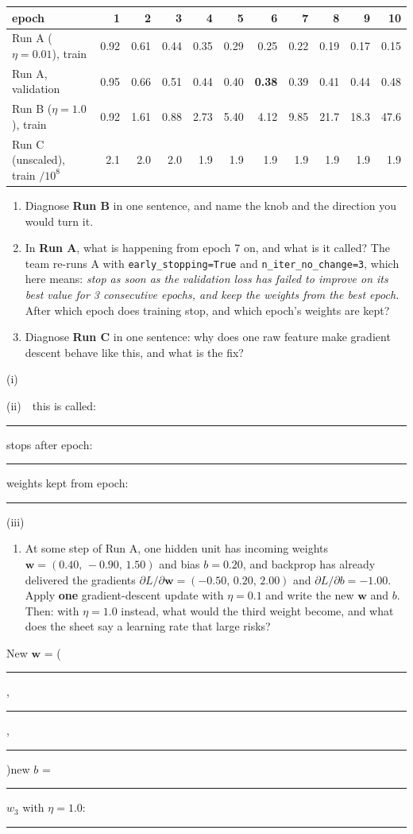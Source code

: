 \documentclass[
  11pt,
]{article}
\providecommand{\tightlist}{%
  \setlength{\itemsep}{0pt}\setlength{\parskip}{0pt}}
\newcommand{\answerspace}[1]{\par\vspace*{#1}}  %
\newcommand{\blank}[1][1.2in]{\rule{#1}{0.4pt}}
\begin{document}
\begin{center}\small\setlength{\tabcolsep}{4.5pt}
\begin{tabular}{@{}lrrrrrrrrrr@{}}\toprule
epoch & 1 & 2 & 3 & 4 & 5 & 6 & 7 & 8 & 9 & 10\\ \midrule
Run A ($\eta=0.01$), train      & 0.92 & 0.61 & 0.44 & 0.35 & 0.29 & 0.25 & 0.22 & 0.19 & 0.17 & 0.15\\
Run A, validation               & 0.95 & 0.66 & 0.51 & 0.44 & 0.40 & \textbf{0.38} & 0.39 & 0.41 & 0.44 & 0.48\\
Run B ($\eta=1.0$), train       & 0.92 & 1.61 & 0.88 & 2.73 & 5.40 & 4.12 & 9.85 & 21.7 & 18.3 & 47.6\\
Run C (unscaled), train $/10^8$ & 2.1 & 2.0 & 2.0 & 1.9 & 1.9 & 1.9 & 1.9 & 1.9 & 1.9 & 1.9\\
\bottomrule\end{tabular}\end{center}

\begin{enumerate}[label=(\roman*),leftmargin=3.2em,topsep=2pt]
\item Diagnose \textbf{Run B} in one sentence, and name the knob and the
  direction you would turn it.
\item In \textbf{Run A}, what is happening from epoch 7 on, and what is it
  called? The team re-runs A with \texttt{early\_stopping=True} and
  \texttt{n\_iter\_no\_change=3}, which here means: \emph{stop as soon as the
  validation loss has failed to improve on its best value for 3 consecutive
  epochs, and keep the weights from the best epoch.} After which epoch does
  training stop, and which epoch's weights are kept?
\item Diagnose \textbf{Run C} in one sentence: why does one raw feature make
  gradient descent behave like this, and what is the fix?
\end{enumerate}

\noindent (i)\answerspace{1in}
\noindent (ii)\ \ this is called: \blank[1.2in]\quad stops after epoch: \blank[0.5in]\quad weights kept from epoch: \blank[0.5in]\answerspace{1in}
\noindent (iii)\answerspace{1in}

\begin{enumerate}
\def\labelenumi{(\alph{enumi})}
\setcounter{enumi}{2}
\tightlist
\item
  At some step of Run A, one hidden unit has incoming weights
  \(\mathbf w = (0.40,\,-0.90,\,1.50)\) and bias \(b = 0.20\), and
  backprop has already delivered the gradients
  \(\partial L/\partial \mathbf w = (-0.50,\,0.20,\,2.00)\) and
  \(\partial L/\partial b = -1.00\). Apply \textbf{one} gradient-descent
  update with \(\eta = 0.1\) and write the new \(\mathbf w\) and \(b\).
  Then: with \(\eta = 1.0\) instead, what would the third weight become,
  and what does the sheet say a learning rate that large risks?
\end{enumerate}

New \(\mathbf w\) = ( \blank[0.6in] , \blank[0.6in] ,
\blank[0.6in] )\qquad new \(b\) = \blank[0.6in]\qquad \(w_3\) with
\(\eta=1.0\): \blank[0.6in]

\mbox{}

\par\nobreak\answerspace{1.4in}
\end{document}
